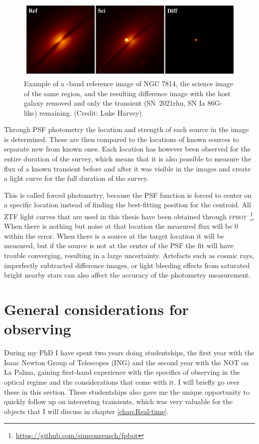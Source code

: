 \documentclass[a4paper,oneside,12pt, class=Latex/Classes/PhDthesisPSnPDF, crop=false]{standalone}
\begin{document}
\begin{figure}
    \centering
    \includegraphics[width=\textwidth]{../Images/chapter_2/diff_im_SN2021rhu.png}
    \caption{Example of a \ztfr-band reference image of NGC 7814, the science image of the same region, and the resulting difference image with the host galaxy removed and only the transient (SN~2021rhu, SN Ia 86G-like) remaining. (Credit: Luke Harvey)}
    \label{diff_im_example}
\end{figure}

Through PSF photometry the location and strength of each source in the image is determined. These are then compared to the locations of known sources to separate new from known ones. Each location has however been observed for the entire duration of the survey, which means that it is also possible to measure the flux of a known transient before and after it was visible in the images and create a light curve for the full duration of the survey.

This is called forced photometry, because the PSF function is forced to center on a specific location instead of finding the best-fitting position for the centroid. All ZTF light curves that are used in this thesis have been obtained through \textsc{fpbot} \citep{fpbot}\,\footnote{\url{https://github.com/simeonreusch/fpbot}}. When there is nothing but noise at that location the measured flux will be 0 within the error. When there is a source at the target location it will be measured, but if the source is not at the center of the PSF the fit will have trouble converging, resulting in a large uncertainty. Artefacts such as cosmic rays, imperfectly subtracted difference images, or light bleeding effects from saturated bright nearby stars can also affect the accuracy of the photometry measurement.


\section{General considerations for observing}
\label{considerations}
During my PhD I have spent two years doing studentships, the first year with the Isaac Newton Group of Telescopes (ING) and the second year with the NOT on La Palma, gaining first-hand experience with the specifics of observing in the optical regime and the considerations that come with it. I will briefly go over these in this section. These studentships also gave me the unique opportunity to quickly follow up on interesting transients, which was very valuable for the objects that I will discuss in chapter \ref{chap:Real-time}.
\end{document}

